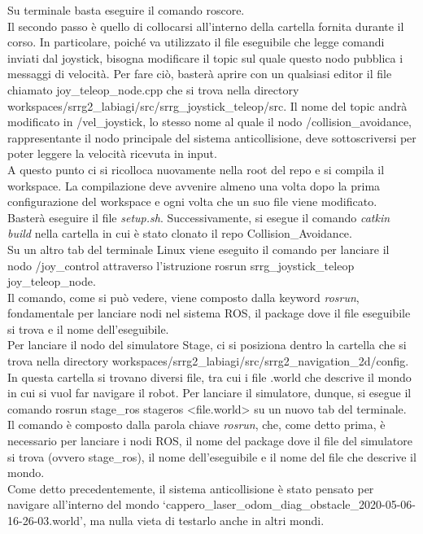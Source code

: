 Su terminale basta eseguire il comando
roscore.\\
Il secondo passo è quello di collocarsi all’interno della cartella fornita durante il corso. In particolare, poiché va utilizzato il file eseguibile che legge comandi inviati dal joystick, bisogna modificare il topic sul quale questo nodo pubblica i messaggi di velocità. Per fare ciò, basterà aprire con un qualsiasi editor il file chiamato joy\_teleop\_node.cpp  che si trova nella directory workspaces/srrg2\_labiagi/src/srrg\_joystick\_teleop/src. Il nome del topic andrà modificato in /vel\_joystick, lo stesso nome al quale il nodo /collision\_avoidance, rappresentante il nodo principale del sistema anticollisione, deve sottoscriversi per poter leggere la velocità ricevuta in input.\\
A questo punto ci si ricolloca nuovamente nella root del repo e si compila il workspace. La compilazione deve avvenire almeno una volta dopo la prima configurazione del workspace e ogni volta che un suo file viene modificato. Basterà eseguire il file \textit{setup.sh}.
Successivamente, si esegue il comando \textit{catkin build} nella cartella in cui è stato clonato il repo Collision\_Avoidance.\\
Su un altro tab del terminale Linux viene eseguito il comando per lanciare il nodo /joy\_control attraverso l'istruzione rosrun srrg\_joystick\_teleop joy\_teleop\_node.\\
Il comando, come si può vedere, viene composto dalla keyword \textit{rosrun}, fondamentale per lanciare nodi nel sistema ROS, il package dove il file eseguibile si trova e il nome dell’eseguibile.\\
Per lanciare il nodo del simulatore Stage, ci si posiziona dentro la cartella che si trova nella directory workspaces/srrg2\_labiagi/src/srrg2\_navigation\_2d/config.\\
In questa cartella si trovano diversi file, tra cui i file .world che descrive il mondo in cui si vuol far navigare il robot.
Per lanciare il simulatore, dunque, si esegue il comando rosrun stage\_ros stageros <file.world> su un nuovo tab del terminale.\\
Il comando è composto dalla parola chiave \textit{rosrun}, che, come detto prima, è necessario per lanciare i nodi ROS, il nome del package dove il file del simulatore si trova (ovvero stage\_ros), il nome dell'eseguibile e il nome del file che descrive il mondo.\\
Come detto precedentemente, il sistema anticollisione è stato pensato per navigare all’interno del mondo ‘cappero\_laser\_odom\_diag\_obstacle\_2020-05-06-16-26-03.world’, ma nulla vieta di testarlo anche in altri mondi.\\
